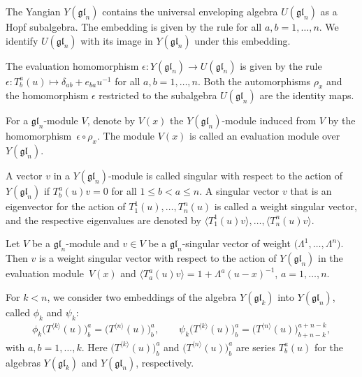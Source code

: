 \documentclass[pdftex]{sigma}
\numberwithin{equation}{section}
\begin{document}
The Yangian $Y(\mathfrak{g l}_{n})$ contains the universal enveloping algebra $U(\mathfrak{g l}_{n})$ as a Hopf subalgebra. The embedding is given by the rule  for all $a, b=1, \dots, n$. We identify $U(\mathfrak{g l}_{n})$ with its image in $Y(\mathfrak{g l}_{n})$ under this embedding.

The evaluation homomorphism $\epsilon\colon Y (\mathfrak{gl}_n) \rightarrow U(\mathfrak{gl}_n)$ is given by the rule $\epsilon\colon T_{b}^a(u) \mapsto \delta_{ab}+e_{ba}u^{-1}$ for all $a,b = 1,\dots,n$. Both the automorphisms $\rho_x$ and the homomorphism $\epsilon$ restricted to the subalgebra $U(\mathfrak{gl}_n)$ are the identity maps.

For a $\mathfrak{gl}_n$-module $V$, denote by $V(x)$ the $Y(\mathfrak{gl}_n)$-module induced from $V$ by the homomorphism~${\epsilon\circ \rho_x}$. The module $V(x)$ is called an evaluation module over $Y(\mathfrak{gl}_n)$.

A vector $v$ in a $Y(\mathfrak{gl}_n)$-module is called singular with respect to the action of $Y(\mathfrak{gl}_n)$ if ${T^{a}_{b}(u)v = 0}$ for all $1\leq b < a \leq n$. A singular vector $v$ that is an eigenvector for the action of $T_{1}^{1}(u),\dots,T_{n}^{n}(u)$ is called a weight singular vector, and the respective eigenvalues are denoted by $\bigl\langle T^1_{1}(u)v\bigr\rangle,\dots, \langle T^n_{n}(u)v\rangle$.

\begin{Example}%
Let $V$ be a $\mathfrak{g l}_{n}$-module and $v \in V$ be a $\mathfrak{gl}_n$-singular vector of weight $\bigl(\Lambda^{1}, \dots, \Lambda^{n}\bigr)$. Then $v$ is a weight singular vector with respect to the action of $Y(\mathfrak{g l}_{n})$ in the evaluation module~$V(x)$ and $\langle T^a_{ a}(u) v\rangle=1+\Lambda^{a}(u-x)^{-1}$, $a=1, \dots, n$.
\end{Example}

For $k<n$, we consider two embeddings of the algebra $Y(\mathfrak{gl}_{k})$ into $Y(\mathfrak{gl}_{n})$, called $\phi_k$ and $\psi_k$:
\begin{gather}\label{embeddings}
\phi_k\bigl(T^{\langle k\rangle}(u)\bigr)^a_b=\bigl(T^{\langle n\rangle}(u)\bigr)^a_b,\qquad
\psi_k\bigl(T^{\langle k\rangle}(u)\bigr)^a_b=\bigl(T^{\langle n\rangle}(u)\bigr)^{a+n-k}_{b+n-k},
\end{gather}
with $a,b=1,\dots, k$. Here $\bigl(T^{\langle k\rangle}(u)\bigr)^a_b$ and $\bigl(T^{\langle n\rangle}(u)\bigr)^a_b$ are series $T^a_b(u)$ for the algebras $Y(\mathfrak{gl}_{k})$ and $Y(\mathfrak{gl}_{n})$, respectively.
\end{document}
